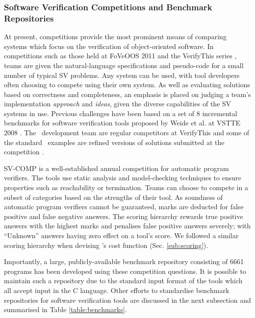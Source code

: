 \subsubsection{Software Verification Competitions and Benchmark Repositories}
\label{sub:lrsvmmbench}

At present, competitions provide the most prominent means of comparing systems which focus on the verification of object-oriented software. 
In competitions such as those held at FoVeOOS 2011 \cite{bormer:hal-00789525} and the VerifyThis series \cite{Huisman2015}, teams are given the natural-language specifications and pseudo-code for a small number of typical SV problems. 
Any system can be used, with tool developers often choosing to compete using their own system. 
As well as evaluating solutions based on correctness and completeness, an emphasis is placed on judging a team's implementation \textit{approach} and \textit{ideas}, given the diverse capabilities of the SV systems in use. 
Previous challenges have been based on a set of 8 incremental benchmarks for software verification tools proposed by Weide et al. at VSTTE 2008 \cite{Weide2008}. The \why~development team are regular competitors at VerifyThis and some of the standard \why~examples are refined versions of solutions submitted at the competition \cite{verifythis}.  


SV-COMP \cite{Beyer2016, SVCOMP} is a well-established annual competition for automatic program verifiers. 
The tools use static analysis and model-checking techniques to ensure properties such as reachability or termination. 
Teams can choose to compete in a subset of categories based on the strengths of their tool. 
As soundness of automatic program verifiers cannot be guaranteed, marks are deducted for false positive and false negative answers. 
The scoring hierarchy rewards true positive answers with the highest marks and penalises false positive answers severely; with ``Unknown'' answers having zero effect on a tool's score.
We followed a similar scoring hierarchy when devising \where's cost function (Sec. \ref{sub:scoring}).
 
Importantly, a large, publicly-available benchmark repository consisting of 6661 programs  has been developed using these competition questions. It is possible to maintain such a repository due to the standard input format of the tools which all accept input in the C language. Other efforts to standardise benchmark repositories for software verification tools are discussed in the next subsection and summarised in Table \ref{table:benchmarks}.  

